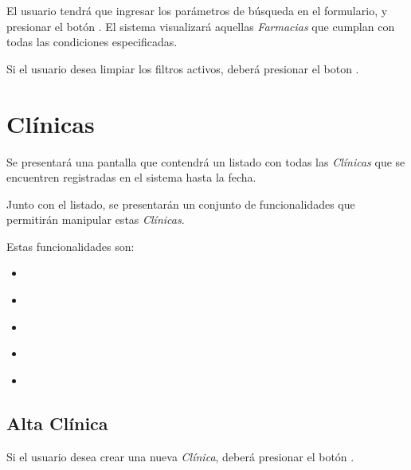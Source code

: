 \documentclass[a4paper,10pt,spanish]{sphinxmanual}
\begin{document}
El usuario tendrá que ingresar los parámetros de búsqueda en el formulario, y presionar el botón . El sistema visualizará aquellas \emph{Farmacias} que cumplan con todas las condiciones especificadas.

Si el usuario desea limpiar los filtros activos, deberá presionar el boton .



\section{Clínicas}
\label{clinicas:clinicas}\label{clinicas::doc}
Se presentará una pantalla que contendrá un listado con todas las \emph{Clínicas} que se encuentren registradas en el sistema hasta la fecha.


Junto con el listado, se presentarán un conjunto de funcionalidades que permitirán manipular estas \emph{Clínicas}.

Estas funcionalidades son:
\begin{itemize}
\item {} 
{\hyperref[clinicas:alta\string-clinica]{}}

\item {} 
{\hyperref[clinicas:ver\string-obras\string-sociales]{}}

\item {} 
{\hyperref[clinicas:modificar\string-clinica]{}}

\item {} 
{\hyperref[clinicas:eliminar\string-clinica]{}}

\item {} 
{\hyperref[clinicas:formulario\string-busqueda\string-clinica]{}}

\end{itemize}


\subsection{Alta Clínica}
\label{clinicas:alta-clinica}\label{clinicas:id1}
Si el usuario desea crear una nueva \emph{Clínica}, deberá presionar el botón .
\end{document}

